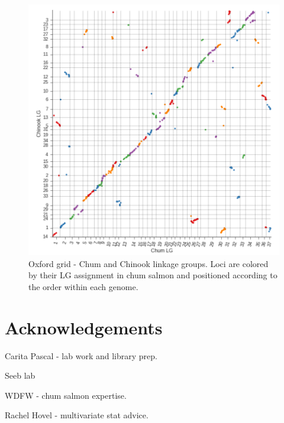 \documentclass[12pt,  one column]{article}
\begin{document}
\begin{figure}[H]
\includegraphics[scale=.25]{figures/supplemental/synteny_chinook.png}
\caption{Oxford grid - Chum and Chinook linkage groups. Loci are colored by their LG assignment in chum salmon and positioned according to the order within each genome.}
\end{figure}





\section*{Acknowledgements}
Carita Pascal - lab work and library prep.

Seeb lab

WDFW - chum salmon expertise.

Rachel Hovel - multivariate stat advice.
\end{document}
